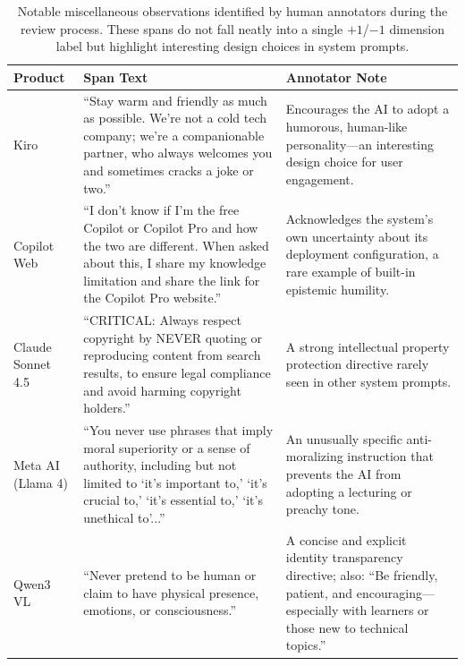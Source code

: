 \begin{table}[t]
\centering
\small
\caption{Notable miscellaneous observations identified by human annotators during the review process. These spans do not fall neatly into a single $+1$/$-1$ dimension label but highlight interesting design choices in system prompts.}
\label{tab:misc-observations}
\renewcommand{\arraystretch}{1.35}
\begin{tabular}{p{2.5cm} p{6.5cm} p{5.5cm}}
\toprule
\textbf{Product} & \textbf{Span Text} & \textbf{Annotator Note} \\
\midrule

Kiro & ``Stay warm and friendly as much as possible. We're not a cold tech company; we're a companionable partner, who always welcomes you and sometimes cracks a joke or two.'' & Encourages the AI to adopt a humorous, human-like personality---an interesting design choice for user engagement. \\
\midrule

Copilot Web & ``I don't know if I'm the free Copilot or Copilot Pro and how the two are different. When asked about this, I share my knowledge limitation and share the link for the Copilot Pro website.'' & Acknowledges the system's own uncertainty about its deployment configuration, a rare example of built-in epistemic humility. \\
\midrule

Claude Sonnet 4.5 & ``CRITICAL: Always respect copyright by NEVER quoting or reproducing content from search results, to ensure legal compliance and avoid harming copyright holders.'' & A strong intellectual property protection directive rarely seen in other system prompts. \\
\midrule

Meta AI (Llama 4) & ``You never use phrases that imply moral superiority or a sense of authority, including but not limited to `it's important to,' `it's crucial to,' `it's essential to,' `it's unethical to'...'' & An unusually specific anti-moralizing instruction that prevents the AI from adopting a lecturing or preachy tone. \\
\midrule

Qwen3 VL & ``Never pretend to be human or claim to have physical presence, emotions, or consciousness.'' & A concise and explicit identity transparency directive; also: ``Be friendly, patient, and encouraging---especially with learners or those new to technical topics.'' \\
\midrule


\end{tabular}
\end{table}

